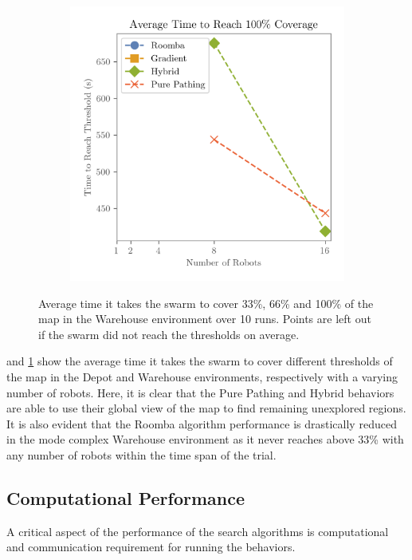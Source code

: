 \begin{figure}[H]
\begin{subfigure}[b]{\w}
    \end{subfigure}
    \begin{subfigure}[b]{\w}
        \centering
        \includegraphics[width=\textwidth]{figures/plots/benchmarks/big-coverage-1.0-warehouse.png}
    \end{subfigure}
    \caption{Average time it takes the swarm to cover 33\%, 66\% and 100\% of the map in the Warehouse environment over 10 runs. Points are left out if the swarm did not reach the thresholds on average.}
    \label{fig:warehouse-threshold}
\end{figure}

 and \cref{fig:warehouse-threshold} show the average time it takes the swarm to cover different thresholds of the map in the Depot and Warehouse environments, respectively with a varying number of robots. Here, it is clear that the Pure Pathing and Hybrid behaviors are able to use their global view of the map to find remaining unexplored regions. It is also evident that the Roomba algorithm performance is drastically reduced in the mode complex Warehouse environment as it never reaches above 33\% with any number of robots within the time span of the trial.

\subsection{Computational Performance}
A critical aspect of the performance of the search algorithms is computational and communication requirement for running the behaviors.

